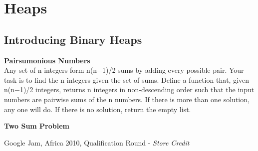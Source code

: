 
\chapter{Heaps}


\section{Introducing Binary Heaps}


\begin{example}

\textbf{Pairsumonious Numbers} \\
Any set of n integers form n(n−1)/2 sums by adding every possible pair. Your task is to ﬁnd the
n integers given the set of sums. Deﬁne a function that, given n(n−1)/2 integers, 
returns n integers in non-descending order such that the input numbers are pairwise sums 
of the n numbers. If there is more than one solution, 
any one will do. If there is no solution, return the empty list.


\textbf{Two Sum Problem} 


\begin{example}
Google Jam, Africa 2010, Qualification Round - \textit{Store Credit}
\end{example}


\end{example}
